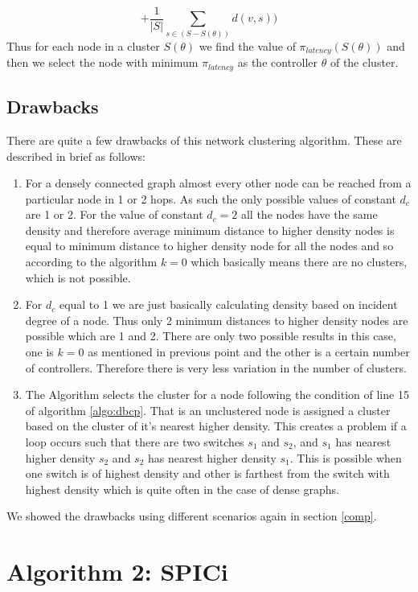 \documentclass[10pt]{extarticle}
\begin{document}
	\begin{equation}
	 + \frac{1}{|S|} \sum_{s\in (S-S(\theta))}d(v,s))
	\end{equation}
	Thus for each node in a cluster $S(\theta)$ we find the value of $\pi_{latency}(S(\theta))$ and then we select the node with minimum $\pi_{latency}$ as the controller $\theta$ of the cluster.
	
	\subsection{Drawbacks}
	There are quite a few drawbacks of this network clustering algorithm. These are described in brief as follows:
	
	\begin{enumerate}
		\item For a densely connected graph almost every other node can be reached from a particular node in 1 or 2 hops. As such the only possible values of constant $d_c$ are 1 or 2. For the value of constant $d_c=2$ all the nodes have the same density and therefore average minimum distance to higher density nodes is equal to minimum distance to higher density node for all the nodes and so according to the algorithm $k=0$ which basically means there are no clusters, which is not possible.
		\item For $d_c$ equal to 1 we are just basically calculating density based on incident degree of a node. Thus only 2 minimum distances to higher density nodes are possible which are 1 and 2.
		There are only two possible results in this case, one is $k=0$ as mentioned in previous point and the other is a certain number of controllers. Therefore there is very less variation in the number of clusters.
		\item The Algorithm selects the cluster for a node following the condition of line 15 of algorithm \ref{algo:dbcp}. That is an unclustered node is assigned a cluster based on the cluster of it's nearest higher density. This creates a problem if a loop occurs such that there are two switches $s_1$ and $s_2$, and $s_1$ has nearest higher density $s_2$ and $s_2$ has nearest higher density $s_1$. This is possible when one switch is of highest density and other is farthest from the switch with highest density which is quite often in the case of dense graphs.
	\end{enumerate}

	We showed the drawbacks using different scenarios again in section \ref{comp}.
	
	\section{Algorithm 2: SPICi}	\label{algo:spici}
	
\end{document}
